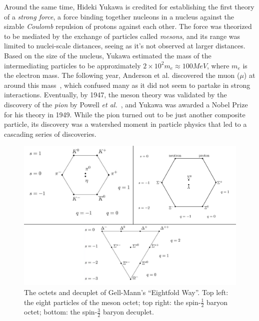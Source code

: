 Around the same time, Hideki Yukawa is credited for establishing the first theory of a \emph{strong force}, a force binding together nucleons in a nucleus against the sizable \emph{Coulomb} repulsion of protons against each other. The force was theorized to be mediated by the exchange of particles called \emph{mesons}, and its range was limited to nuclei-scale distances, seeing as it's not observed at larger distances. Based on the size of the nucleus, Yukawa estimated the mass of the intermediating particles to be approximately $2 \times 10^2 m_e \approx 100 MeV$, where $m_e$ is the electron mass. The following year, Anderson et al. discovered the muon ($\mu$) at around this mass~\cite{Anderson:1936zz}, which confused many as it did not seem to partake in strong interactions. Eventually, by 1947, the meson theory was validated by the discovery of the \emph{pion} by Powell \emph{et al.}~\cite{Powell:1946pu}, and Yukawa was awarded a Nobel Prize for his theory in 1949. While the pion turned out to be just another composite particle, its discovery was a watershed moment in particle physics that led to a cascading series of discoveries. 
\begin{figure}
	\centering
	\includegraphics[width=5in]{figures/background/mesons_baryons.pdf}
	\caption{The octets and decuplet of Gell-Mann's ``Eightfold Way''. Top left: the eight particles of the meson octet; top right: the spin-$\frac{1}{2}$ baryon octet; bottom: the spin-$\frac{3}{2}$ baryon decuplet.}
	\label{fig:mesons-baryons}
\end{figure}

